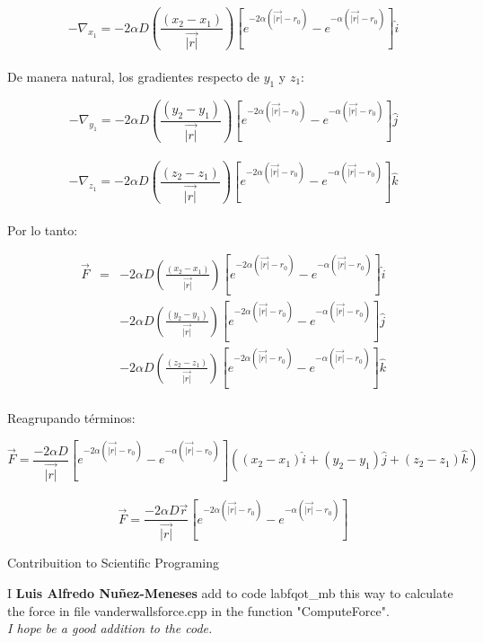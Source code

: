 \documentclass[8pt]{article}
\begin{document}
\begin{equation}
-\nabla_{x_1} = -2\alpha D \left(\frac{(x_2-x_1)}{\vec{|r|}} \right) \left[e^{-2\alpha(\vec{|r|}-r_0)} - e^{-\alpha(\vec{|r|}-r_0)} \right] \hat{\textit{i}}
\end{equation}
\\

De manera natural, los gradientes respecto de $y_1$ y $z_1$:

\begin{equation}
-\nabla_{y_1} = -2\alpha D \left(\frac{(y_2-y_1)}{\vec{|r|}} \right) \left[e^{-2\alpha(\vec{|r|}-r_0)} - e^{-\alpha(\vec{|r|}-r_0)} \right] \hat{\textit{j}}
\end{equation}
\\
\begin{equation}
-\nabla_{z_1} = -2\alpha D \left(\frac{(z_2-z_1)}{\vec{|r|}} \right) \left[e^{-2\alpha(\vec{|r|}-r_0)} - e^{-\alpha(\vec{|r|}-r_0)} \right] \hat{\textit{k}}
\end{equation}
\\

Por lo tanto:

\begin{eqnarray}
\vec{F} &=&  -2\alpha D \left(\frac{(x_2-x_1)}{\vec{|r|}} \right) \left[e^{-2\alpha(\vec{|r|}-r_0)} - e^{-\alpha(\vec{|r|}-r_0)} \right] \hat{\textit{i}} \nonumber\\
&& - 2\alpha D \left(\frac{(y_2-y_1)}{\vec{|r|}} \right) \left[e^{-2\alpha(\vec{|r|}-r_0)} - e^{-\alpha(\vec{|r|}-r_0)} \right] \hat{\textit{j}} \nonumber\\
&& - 2\alpha D \left(\frac{(z_2-z_1)}{\vec{|r|}} \right) \left[e^{-2\alpha(\vec{|r|}-r_0)} - e^{-\alpha(\vec{|r|}-r_0)} \right] \hat{\textit{k}}
\end{eqnarray}
\\

Reagrupando términos:

\begin{equation}
\vec{F}= \frac{-2\alpha D}{\vec{|r|}} \left[e^{-2\alpha(\vec{|r|}-r_0)} - e^{-\alpha(\vec{|r|}-r_0)} \right] 
( (x_2-x_1)\hat{\textit{i}} 
     + (y_2-y_1)\hat{\textit{j}} 
     + (z_2-z_1)\hat{\textit{k}} )
\end{equation}
\\
\begin{equation}
\vec{F}= \frac{-2\alpha D \vec{r}}{\vec{|r|}} \left[e^{-2\alpha(\vec{|r|}-r_0)} - e^{-\alpha(\vec{|r|}-r_0)} \right] 
\end{equation}

\vspace{2cm}

\huge {Contribuition to Scientific Programing }

\vspace{1cm}
\Large {I  {\bf Luis Alfredo Nuñez-Meneses} add to code labfqot\_mb this way to calculate the force in file vanderwallsforce.cpp in the function "ComputeForce".} \\

\it {I hope be a good addition to the code.}
\end{document}
